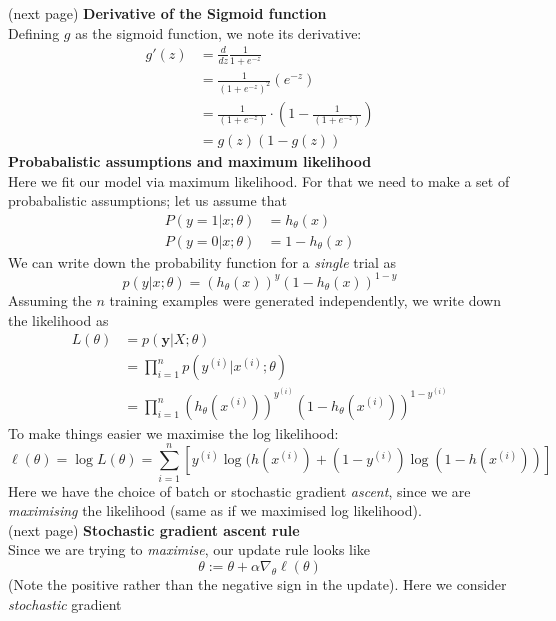 \documentclass{report}
\begin{document}
(next page)
\newpage
\noindent\textbf{Derivative of the Sigmoid function}\\
Defining $g$ as the sigmoid function, we note its derivative:
\begin{align*}
g'(z)&=\frac{d}{dz}\frac{1}{1+e^{-z}}\\
&=\frac{1}{(1+e^{-z})^2}(e^{-z})\\
&=\frac{1}{(1+e^{-z})}\cdot\left(1-\frac{1}{(1+e^{-z})}\right)\\
&=g(z)(1-g(z))
\end{align*}
\textbf{Probabalistic assumptions and maximum likelihood}\\
Here we fit our model via maximum likelihood. For that
we need to make a set of probabalistic assumptions; let us assume that
\begin{align*}
P(y=1|x;\theta)&=h_\theta(x)\\
P(y=0|x;\theta)&=1-h_\theta(x)
\end{align*}
We can write down the probability function for a \textit{single} trial as
\begin{equation*}
p(y|x;\theta)=(h_\theta(x))^y(1-h_\theta(x))^{1-y}
\end{equation*}
Assuming the $n$ training examples were generated independently, we write down the likelihood as
\begin{align*}
L(\theta)&=p(\bm{y}|X;\theta)\\
&=\prod^n_{i=1}p(y^{(i)}|x^{(i)};\theta)\\
&=\prod^n_{i=1}(h_\theta(x^{(i)}))^{y^{(i)}}(1-h_\theta(x^{(i)}))^{1-y^{(i)}}
\end{align*}
To make things easier we maximise the log likelihood:
\begin{equation*}
\ell(\theta)=\log L(\theta)=\sum^n_{i=1}\left[
y^{(i)}\log(h(x^{(i)})+(1-y^{(i)})\log(1-h(x^{(i)}))\right]
\end{equation*}
Here we have the choice of batch or stochastic gradient \textit{ascent}, since we are \textit{maximising}
the likelihood (same as if we maximised log likelihood).\\
(next page)
\newpage
\noindent\textbf{Stochastic gradient ascent rule}\\
Since we are trying to \textit{maximise}, our update rule looks like
\begin{equation*}
\theta:=\theta+\alpha\nabla_\theta\ell(\theta)
\end{equation*}
(Note the positive rather than the negative sign in the update). Here we consider \textit{stochastic} gradient
\end{document}

